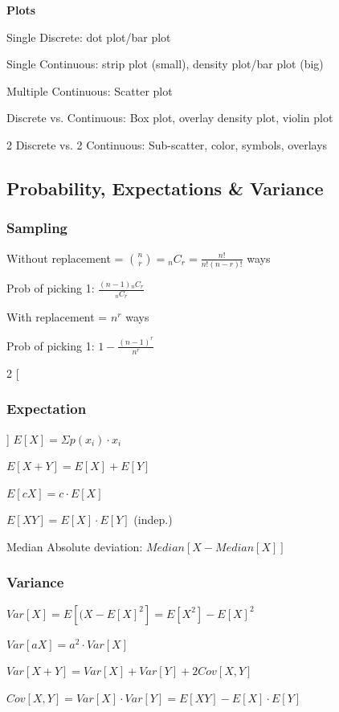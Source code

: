 \documentclass[8pt]{extarticle}
\begin{document}
\textbf{Plots}

Single Discrete: dot plot/bar plot\par
Single Continuous: strip plot (small), density plot/bar plot (big) \par
Multiple Continuous: Scatter plot\par
Discrete vs. Continuous: Box plot, overlay density plot, violin plot\par
2 Discrete vs. 2 Continuous: Sub-scatter, color, symbols, overlays\\

\hline

\subsection*{Probability, Expectations \& Variance}
\subsubsection*{Sampling}
Without replacement = ${n \choose r} = {_nC_r} = \frac{n!}{n!(n-r)!}$ ways\par
Prob of picking 1: $\frac{(n-1) {_nC_r}}{{_nC_r}}$ \par
With replacement = $n^r$ ways \par
Prob of picking 1: $1-\frac{(n-1)^r}{n^r}$ \par

\begin{multicols}{2}
[
\subsubsection*{Expectation}
]
$E[X]=\Sigma {p(x_i)\cdot x_i}$\par
$E[X+Y] = E[X] + E[Y]$\par
$E[cX] = c\cdot E[X]$\par
$E[XY] = E[X]\cdot E[Y]$ (indep.)\par
Median Absolute deviation: $Median[X-Median[X]]$\\
\end{multicols}

\subsubsection*{Variance}
$Var[X] = E[(X-E[X]^2] = E[X^2] - E[X]^2$\par
$Var[aX] = a^2 \cdot Var[X]$\par
$Var[X+Y] = Var[X] + Var[Y] + 2 Cov[X, Y]$\par
$Cov[X, Y] = Var[X] \cdot Var[Y] = E[XY] - E[X]\cdot E[Y]$\\
\end{document}
